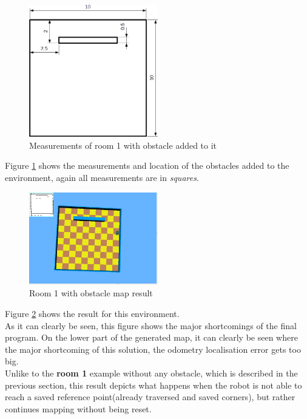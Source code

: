 \begin{figure}[h]
\centering
\includegraphics[width = 0.5\textwidth]{../../figures/room1_obstacle.png}
\caption{Measurements of room 1 with obstacle added to it}
\label{room1_obstacle}
\end{figure}

Figure \ref{room1_obstacle} shows the measurements and location of the obstacles added to the environment, again all measurements are in \textit{squares}.

\begin{figure}[h]
\centering
\includegraphics[width = 0.5\textwidth]{../../figures/map_results/one_obstacle_save_error.png}
\caption{Room 1 with obstacle map result}
\label{room1_obstacle_result}
\end{figure}

Figure \ref{room1_obstacle_result} shows the result for this environment.\\
As it can clearly be seen, this figure shows the major shortcomings of the final program. On the lower part of the generated map, it can clearly be seen where the major shortcoming of this solution, the odometry localisation error gets too big. \\
Unlike to the \textbf{room 1} example without any obstacle, which is described in the previous section, this result depicts what happens when the robot is not able to reach a saved reference point(already traversed and saved corners), but rather continues mapping without being reset. \\[3ex]

